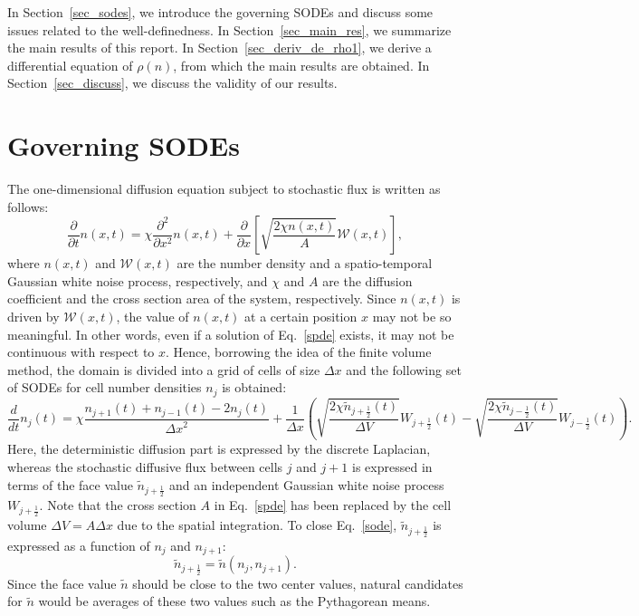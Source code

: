 \documentclass{article}
\newcommand{\dx}{{\Delta x}}
\newcommand{\dV}{{\Delta V}}
\begin{document}
\noindent In Section~\ref{sec_sodes}, we introduce the governing SODEs and discuss some issues related to the well-definedness.
In Section~\ref{sec_main_res}, we summarize the main results of this report.
In Section~\ref{sec_deriv_de_rho1}, we derive a differential equation of $\rho(n)$, from which the main results are obtained.
In Section~\ref{sec_discuss}, we discuss the validity of our results.

\section{\label{sec_sodes}Governing SODEs}

The one-dimensional diffusion equation subject to stochastic flux is written as follows: 
\begin{equation}
\label{spde}
\frac{\partial}{\partial t}n(x,t)
=\chi\frac{\partial^2}{\partial x^2}n(x,t)
+\frac{\partial}{\partial x}\left[
\sqrt{\frac{2\chi n(x,t)}{A}}\bm{\mathcal{W}}(x,t)
\right],
\end{equation}
where $n(x,t)$ and $\bm{\mathcal{W}}(x,t)$ are the number density and a spatio-temporal Gaussian white noise process, respectively, and $\chi$ and $A$ are the diffusion coefficient and the cross section area of the system, respectively.
Since $n(x,t)$ is driven by $\bm{\mathcal{W}}(x,t)$, the value of $n(x,t)$ at a certain position $x$ may not be so meaningful.
In other words, even if a solution of Eq.~\eqref{spde} exists, it may not be continuous with respect to $x$.
Hence, borrowing the idea of the finite volume method, the domain is divided into a grid of cells of size $\dx$ and the following set of SODEs for cell number densities $n_j$ is obtained:
\begin{equation}
\label{sode}
\frac{d}{dt}n_j(t)=\chi\frac{n_{j+1}(t)+n_{j-1}(t)-2n_j(t)}{\dx^2}
+\frac{1}{\dx}\left(
\sqrt{\frac{2\chi\tilde{n}_{j+\frac12}(t)}{\dV}}W_{j+\frac12}(t)
-\sqrt{\frac{2\chi\tilde{n}_{j-\frac12}(t)}{\dV}}W_{j-\frac12}(t)
\right).
\end{equation}
Here, the deterministic diffusion part is expressed by the discrete Laplacian, whereas the stochastic diffusive flux between cells $j$ and $j+1$ is expressed in terms of the face value $\tilde{n}_{j+\frac12}$ and an independent Gaussian white noise process $W_{j+\frac12}$.
Note that the cross section $A$ in Eq.~\eqref{spde} has been replaced by the cell volume $\dV=A\dx$ due to the spatial integration.
To close Eq.~\eqref{sode}, $\tilde{n}_{j+\frac12}$ is expressed as a function of $n_j$ and $n_{j+1}$:
\begin{equation}
\tilde{n}_{j+\frac12}=\tilde{n}(n_j,n_{j+1}).
\end{equation}
Since the face value $\tilde{n}$ should be close to the two center values, natural candidates for $\tilde{n}$ would be averages of these two values such as the Pythagorean means.
\end{document}
